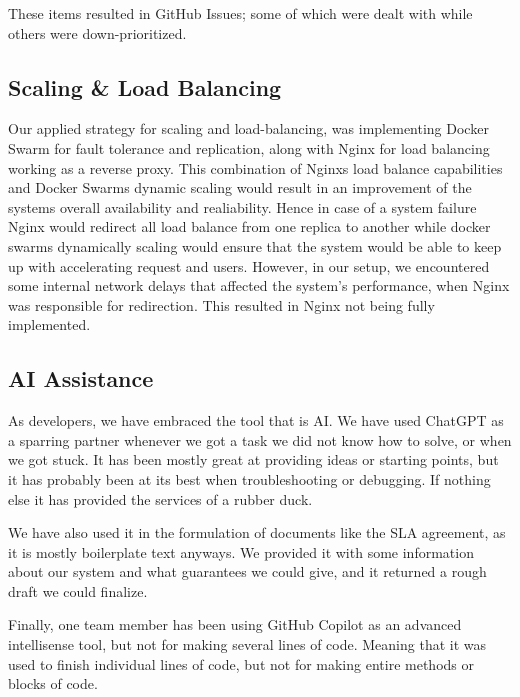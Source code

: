 \noindent These items resulted in GitHub Issues; some of which were dealt with while others were down-prioritized.

\subsection{Scaling \& Load Balancing}

Our applied strategy for scaling and load-balancing, was implementing Docker Swarm for fault tolerance and replication, along with Nginx for load balancing working as a reverse proxy. This combination of Nginxs load balance capabilities and Docker Swarms dynamic scaling would result in an improvement of the systems overall availability and realiability. Hence in case of a system failure Nginx would redirect all load balance from one replica to another while docker swarms dynamically scaling would ensure that the system would be able to keep up with accelerating request and users. However, in our setup, we encountered some internal network delays that affected the system's performance, when Nginx was responsible for redirection. This resulted in Nginx not being fully implemented.



\subsection{AI Assistance}



As developers, we have embraced the tool that is AI. We have used ChatGPT as a sparring partner whenever we got a task we did not know how to solve, or when we got stuck. It has been mostly great at providing ideas or starting points, but it has probably been at its best when troubleshooting or debugging. If nothing else it has provided the services of a rubber duck.

We have also used it in the formulation of documents like the SLA agreement, as it is mostly boilerplate text anyways. We provided it with some information about our system and what guarantees we could give, and it returned a rough draft we could finalize.

Finally, one team member has been using GitHub Copilot as an advanced intellisense tool, but not for making several lines of code. Meaning that it was used to finish individual lines of code, but not for making entire methods or blocks of code.